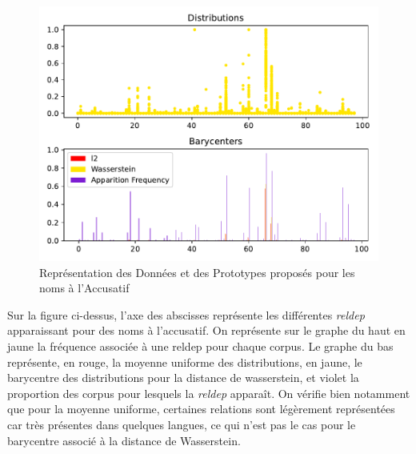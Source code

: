 \documentclass{cours}
\begin{document}
\begin{figure}[H]
\centering
\includegraphics{Figures/Visualisations/Nouns_Wasserstein_Barycenter_Acc}
\caption{Représentation des Données et des Prototypes proposés pour les noms à l'Accusatif}
\end{figure}

Sur la figure ci-dessus, l'axe des abscisses représente les différentes \textit{reldep} apparaissant pour des noms à l'accusatif.
On représente sur le graphe du haut en jaune la fréquence associée à une reldep pour chaque corpus.
Le graphe du bas représente, en rouge, la moyenne uniforme des distributions, en jaune, le barycentre des distributions pour la distance de wasserstein, et violet la proportion des corpus pour lesquels la \textit{reldep} apparaît.
On vérifie bien notamment que pour la moyenne uniforme, certaines relations sont légèrement représentées car très présentes dans quelques langues, ce qui n'est pas le cas pour le barycentre associé à la distance de Wasserstein.
\end{document}
